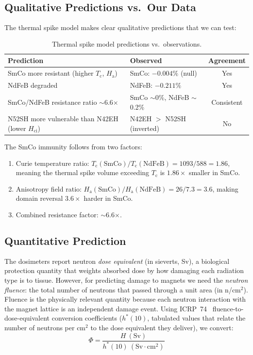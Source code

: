 \documentclass[11pt,letterpaper]{article}
\newcommand{\smco}{SmCo}
\newcommand{\Tc}{T_\mathrm{c}}
\newcommand{\Ha}{H_\mathrm{a}}
\newcommand{\Hci}{H_\mathrm{ci}}
\begin{document}
\subsection{Qualitative Predictions vs.\ Our Data}

The thermal spike model makes clear qualitative predictions that we can test:

\begin{table}[H]
\centering
\caption{Thermal spike model predictions vs.\ observations.}
\label{tab:spike_predictions}
\begin{tabular}{@{}p{5cm}p{4cm}c@{}}
\toprule
\textbf{Prediction} & \textbf{Observed} & \textbf{Agreement} \\
\midrule
SmCo more resistant (higher $\Tc$, $\Ha$) & SmCo: $-0.004\%$ (null) & Yes \\
NdFeB degraded & NdFeB: $-0.211\%$ & Yes \\
SmCo/NdFeB resistance ratio $\sim$6.6$\times$ & SmCo $\sim$0\%, NdFeB $\sim$0.2\% & Consistent \\
N52SH more vulnerable than N42EH (lower $\Hci$) & N42EH $>$ N52SH (inverted) & No \\
\bottomrule
\end{tabular}
\end{table}

The \smco{} immunity follows from two factors:
\begin{enumerate}
    \item Curie temperature ratio: $\Tc(\mathrm{SmCo})/\Tc(\mathrm{NdFeB}) =
    1093/588 = 1.86$, meaning the thermal spike volume exceeding $\Tc$ is
    $1.86\times$ smaller in \smco{}.
    \item Anisotropy field ratio: $\Ha(\mathrm{SmCo})/\Ha(\mathrm{NdFeB}) =
    26/7.3 = 3.6$, making domain reversal $3.6\times$ harder in \smco{}.
    \item Combined resistance factor: $\sim$6.6$\times$.
\end{enumerate}

\subsection{Quantitative Prediction}
\label{sec:quantitative_prediction}

The dosimeters report neutron \emph{dose equivalent} (in sieverts, Sv), a
biological protection quantity that weights absorbed dose by how damaging each
radiation type is to tissue. However, for predicting damage to magnets we need
the \emph{neutron fluence}: the total number of neutrons that passed through a
unit area (in n/cm$^2$). Fluence is the physically relevant quantity because
each neutron interaction with the magnet lattice is an independent damage
event. Using ICRP~74~\cite{ICRP74} fluence-to-dose-equivalent conversion
coefficients ($h^*(10)$, tabulated values that relate the number of neutrons
per cm$^2$ to the dose equivalent they deliver), we convert:
\begin{equation}
    \Phi = \frac{H~(\mathrm{Sv})}{h^*(10)~(\mathrm{Sv} \cdot \mathrm{cm}^2)}
\end{equation}
\end{document}
